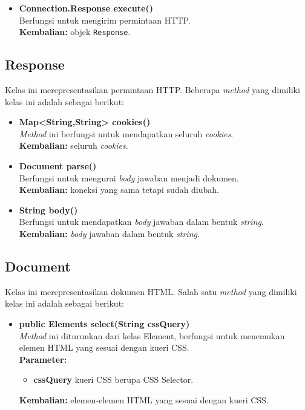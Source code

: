 \begin{itemize}
		\item \textbf{Connection.Response execute()} \\
		Berfungsi untuk mengirim permintaan HTTP.\\
		\textbf{Kembalian:} objek \texttt{Response}.	
\end{itemize}

\subsection{Response}

Kelas ini merepresentasikan permintaan HTTP. Beberapa \textit{method} yang dimiliki kelas ini adalah sebagai berikut:
\begin{itemize}
	\item \textbf{Map<String,String> cookies()} \\
		\textit{Method} ini berfungsi untuk mendapatkan seluruh \textit{cookies}. \\
		\textbf{Kembalian:} seluruh \textit{cookies}.	
		
		\item \textbf{Document parse()} \\
		Berfungsi untuk mengurai \textit{body} jawaban menjadi dokumen. \\
		\textbf{Kembalian:} koneksi yang sama tetapi sudah diubah.
		
		\item \textbf{String body()} \\
		Berfungsi untuk mendapatkan \textit{body} jawaban dalam bentuk \textit{string}. \\
		\textbf{Kembalian:} \textit{body} jawaban dalam bentuk \textit{string}.
\end{itemize}

\subsection{Document}

Kelas ini merepresentasikan dokumen HTML. Salah satu \textit{method} yang dimiliki kelas ini adalah sebagai berikut:
\begin{itemize}
	\item \textbf{public Elements select(String cssQuery)} \\
		\textit{Method} ini diturunkan dari kelas Element, berfungsi untuk menemukan elemen HTML yang sesuai dengan kueri CSS. \\
		\textbf{Parameter:} 
		\begin{itemize}
			\item \textbf{cssQuery} kueri CSS berupa CSS Selector.
		\end{itemize}
		\textbf{Kembalian:} elemen-elemen HTML yang sesuai dengan kueri CSS.	
\end{itemize}

